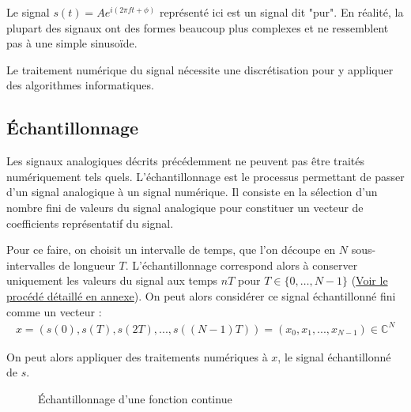     \vspace{0.5cm}

Le signal $s(t) = A e^{i(2\pi ft + \phi)}$ représenté ici est un signal dit "pur". En réalité, la plupart des signaux ont des formes beaucoup plus complexes et ne ressemblent pas à une simple sinusoïde. 

Le traitement numérique du signal nécessite une discrétisation pour y appliquer des algorithmes informatiques.

\subsection{Échantillonnage}
\label{section-echantillonnage}

Les signaux analogiques décrits précédemment ne peuvent pas être traités numériquement tels quels. L'échantillonnage est le processus permettant de passer d'un signal analogique à un signal numérique. Il consiste en la sélection d'un nombre fini de valeurs du signal analogique pour constituer un vecteur de coefficients représentatif du signal.

Pour ce faire, on choisit un intervalle de temps, que l'on découpe en $N$ sous-intervalles de longueur $T$. L'échantillonnage correspond alors à conserver uniquement les valeurs du signal aux temps $nT$ pour $T \in \{0, \dots, N - 1\}$ (\hyperref[preuve-echantillonnage]{Voir le procédé détaillé en annexe}). On peut alors considérer ce signal échantillonné fini comme un vecteur :
\begin{align*}
    x = (s(0),s(T),s(2T),...,s((N-1)T)) =  (x_0,x_1,...,x_{N-1}) \in \mathbb{C}^N
\end{align*}

On peut alors appliquer des traitements numériques à $x$, le signal échantillonné de $s$.

\begin{figure}[H]
    \caption{Échantillonnage d'une fonction continue}
    \begin{center}
    \end{center}
\end{figure}
